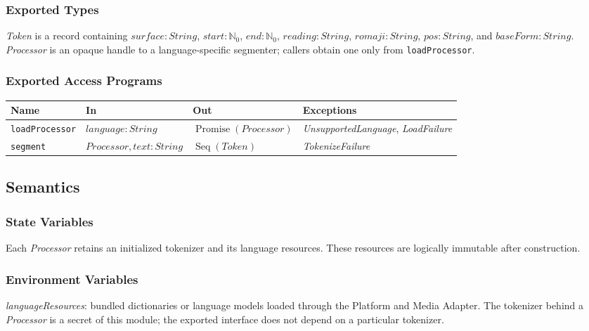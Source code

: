 \documentclass[12pt, titlepage]{article}
\begin{document}
\subsubsection{Exported Types}

\textit{Token} is a record containing $surface:String$, $start:\mathbb{N}_0$,
$end:\mathbb{N}_0$, $reading:String$, $romaji:String$, $pos:String$, and
$baseForm:String$.  \textit{Processor} is an opaque handle to a
language-specific segmenter; callers obtain one only from
\texttt{loadProcessor}.

\subsubsection{Exported Access Programs}

\begin{center}
\footnotesize
\begin{tabularx}{\textwidth}{p{2.4cm} X X p{2.5cm}}
\toprule
\textbf{Name} & \textbf{In} & \textbf{Out} & \textbf{Exceptions} \\
\midrule
\texttt{loadProcessor} & $language:String$ &
$\operatorname{Promise}(Processor)$ &
\textit{UnsupportedLanguage}, \textit{LoadFailure} \\
\texttt{segment} & $Processor, text:String$ &
$\operatorname{Seq}(Token)$ & \textit{TokenizeFailure} \\
\bottomrule
\end{tabularx}
\normalsize
\end{center}

\subsection{Semantics}

\subsubsection{State Variables}

Each \textit{Processor} retains an initialized tokenizer and its language
resources.  These resources are logically immutable after construction.

\subsubsection{Environment Variables}

\textit{languageResources}: bundled dictionaries or language models loaded
through the Platform and Media Adapter.  The tokenizer behind a
\textit{Processor} is a secret of this module; the exported interface does not
depend on a particular tokenizer.
\end{document}
